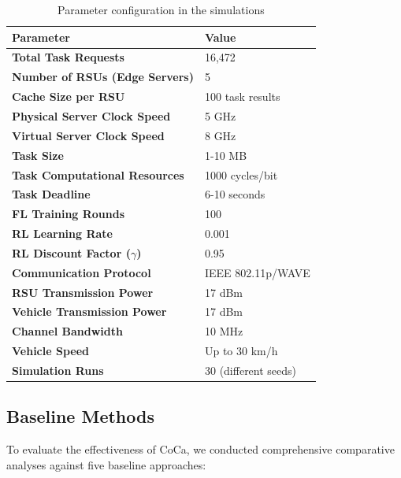 \begin{table}[t]
\centering
\footnotesize
\caption{Parameter configuration in the simulations}
\label{table:settings}
\begin{tabular}{p{5cm}|p{4cm}}
\hline
\rowcolor[gray]{0.9}
\textbf{Parameter} & \textbf{Value} \\
\hline
\textbf{Total Task Requests} & 16,472 \\
\hline
\textbf{Number of RSUs (Edge Servers)} & 5 \\
\hline
\textbf{Cache Size per RSU} & 100 task results \\
\hline
\textbf{Physical Server Clock Speed} & 5 GHz \\
\hline
\textbf{Virtual Server Clock Speed} & 8 GHz \\
\hline
\textbf{Task Size} & 1-10 MB \\
\hline
\textbf{Task Computational Resources} & 1000 cycles/bit \\
\hline
\textbf{Task Deadline} & 6-10 seconds \\
\hline
\textbf{FL Training Rounds} & 100 \\
\hline
\textbf{RL Learning Rate} & 0.001 \\
\hline
\textbf{RL Discount Factor ($\gamma$)} & 0.95 \\
\hline
\textbf{Communication Protocol} & IEEE 802.11p/WAVE \\
\hline
\textbf{RSU Transmission Power} & 17 dBm \\
\hline
\textbf{Vehicle Transmission Power} & 17 dBm \\
\hline
\textbf{Channel Bandwidth} & 10 MHz \\
\hline
\textbf{Vehicle Speed} & Up to 30 km/h \\
\hline
\textbf{Simulation Runs} & 30 (different seeds) \\
\hline
\end{tabular}
\end{table}

\subsection{Baseline Methods}
To evaluate the effectiveness of CoCa, we conducted comprehensive comparative analyses against five baseline approaches:

